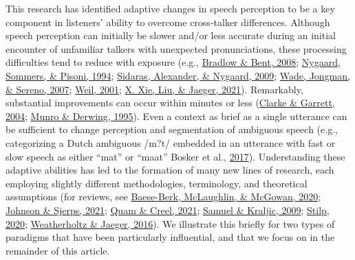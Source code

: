 \documentclass[
  11pt,
  english,
  man,floatsintext]{apa6}
\begin{document}
This research has identified adaptive changes in speech perception to be a key component in listeners' ability to overcome cross-talker differences. Although speech perception can initially be slower and/or less accurate during an initial encounter of unfamiliar talkers with unexpected pronunciations, these processing difficulties tend to reduce with exposure (e.g., \protect\hyperlink{ref-bradlow-bent2008}{Bradlow \& Bent, 2008}; \protect\hyperlink{ref-nygaard1994}{Nygaard, Sommers, \& Pisoni, 1994}; \protect\hyperlink{ref-sidaras2009}{Sidaras, Alexander, \& Nygaard, 2009}; \protect\hyperlink{ref-wade2007}{Wade, Jongman, \& Sereno, 2007}; \protect\hyperlink{ref-weil2001a}{Weil, 2001}; \protect\hyperlink{ref-xie2021jep}{X. Xie, Liu, \& Jaeger, 2021}). Remarkably, substantial improvements can occur within minutes or less (\protect\hyperlink{ref-clarke-garrett2004}{Clarke \& Garrett, 2004}; \protect\hyperlink{ref-munro-derwing1995}{Munro \& Derwing, 1995}). Even a context as brief as a single utterance can be sufficient to change perception and segmentation of ambiguous speech (e.g., categorizing a Dutch ambiguous /m?t/ embedded in an utterance with fast or slow speech as either {``mat''} or {``maat''} Bosker et al., \protect\hyperlink{ref-bosker2017}{2017}). Understanding these adaptive abilities has led to the formation of many new lines of research, each employing slightly different methodologies, terminology, and theoretical assumptions (for reviews, see \protect\hyperlink{ref-baeseberk2020}{Baese-Berk, McLaughlin, \& McGowan, 2020}; \protect\hyperlink{ref-johnson-sjerps2021}{Johnson \& Sjerps, 2021}; \protect\hyperlink{ref-quam-creel2021}{Quam \& Creel, 2021}; \protect\hyperlink{ref-samuel-kraljic2009}{Samuel \& Kraljic, 2009}; \protect\hyperlink{ref-stilp2020}{Stilp, 2020}; \protect\hyperlink{ref-weatherholtz-jaeger2016}{Weatherholtz \& Jaeger, 2016}). We illustrate this briefly for two types of paradigms that have been particularly influential, and that we focus on in the remainder of this article.
\end{document}
